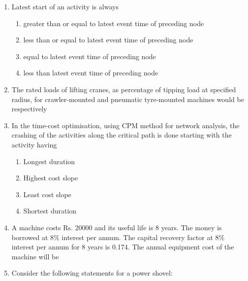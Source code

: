 \documentclass[11pt,a4paper]{article}
\begin{document}
\begin{enumerate}
\begin{enumerate}[label=\Alph*.]
\end{enumerate}
\item{Latest start of an activity is always}
\begin{enumerate}[label=\Alph*.]
\item{greater than or equal to latest event time of preceding node}
\item{less than or equal to latest event time of preceding node}
\item{equal to latest event time of preceding node}
\item{less than latest event time of preceding node}
\end{enumerate}
\item{The rated loads of lifting cranes, as percentage of tipping load at specified radius, for crawler-mounted and pneumatic tyre-mounted machines would be respectively}
\\
\item{In the time-cost optimisation, using CPM method for network analysis, the crashing of the activities along the critical path is done starting with the activity having}
\begin{enumerate}[label=\Alph*.]
\item{Longest duration}
\item{Highest cost slope}
\item{Least cost slope}
\item{Shortest duration}
\end{enumerate}
\item{A machine costs Rs. 20000 and its useful life is 8 years. The money is borrowed at 8\% interest per annum. The capital recovery factor at 8\% interest per annum for 8 years is 0.174. The annual equipment cost of the machine will be}
\\
\item{Consider the following statements for a power shovel: \\
}
\end{enumerate}
\end{document}
